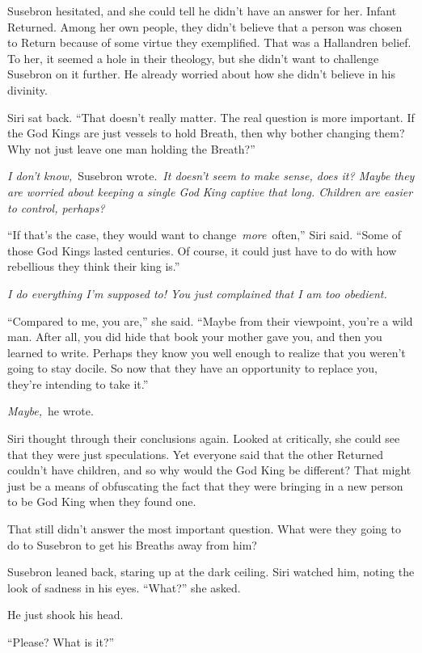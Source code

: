 Susebron hesitated, and she could tell he didn’t have an answer for her. Infant Returned. Among her own people, they didn’t believe that a person was chosen to Return because of some virtue they exemplified. That was a Hallandren belief. To her, it seemed a hole in their theology, but she didn’t want to challenge Susebron on it further. He already worried about how she didn’t believe in his divinity.

Siri sat back. “That doesn’t really matter. The real question is more important. If the God Kings are just vessels to hold Breath, then why bother changing them? Why not just leave one man holding the Breath?”

\textit{I don’t know,}~Susebron wrote.~\textit{It doesn’t seem to make sense, does it? Maybe they are worried about keeping a single God King captive that long. Children are easier to control, perhaps?}

“If that’s the case, they would want to change~\textit{more}~often,” Siri said. “Some of those God Kings lasted centuries. Of course, it could just have to do with how rebellious they think their king is.”

\textit{I do everything I’m supposed to! You just complained that I am too obedient.}

“Compared to me, you are,” she said. “Maybe from their viewpoint, you’re a wild man. After all, you did hide that book your mother gave you, and then you learned to write. Perhaps they know you well enough to realize that you weren’t going to stay docile. So now that they have an opportunity to replace you, they’re intending to take it.”

\textit{Maybe,}~he wrote.

Siri thought through their conclusions again. Looked at critically, she could see that they were just speculations. Yet everyone said that the other Returned couldn’t have children, and so why would the God King be different? That might just be a means of obfuscating the fact that they were bringing in a new person to be God King when they found one.

That still didn’t answer the most important question. What were they going to do to Susebron to get his Breaths away from him?

Susebron leaned back, staring up at the dark ceiling. Siri watched him, noting the look of sadness in his eyes. “What?” she asked.

He just shook his head.

“Please? What is it?”

